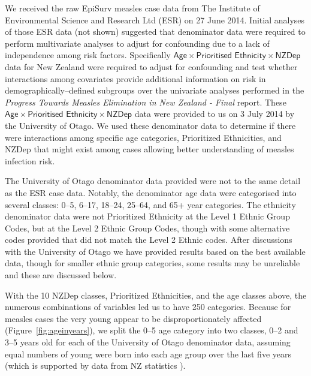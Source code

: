 \documentclass{article}
\begin{document}
\begin{itemize}
We received the raw EpiSurv measles case data from The Institute of Environmental Science and Research Ltd (ESR) on 27 June 2014. Initial analyses of those ESR data (not shown) suggested that denominator data were required to perform multivariate analyses to adjust for confounding due to a lack of independence among risk factors. Specifically $\textsf{Age} \times \textsf{Prioritised Ethnicity} \times \textsf{NZDep}$ data for New Zealand were required to adjust for confounding and test whether interactions among covariates provide additional information on risk in demographically--defined subgroups over the univariate analyses performed in the \emph{Progress Towards Measles Elimination in New Zealand - Final} report. These $\textsf{Age} \times \textsf{Prioritised Ethnicity} \times \textsf{NZDep}$ data were provided to us on 3 July 2014 by the University of Otago. We used these denominator data to determine if there were interactions among specific age categories, Prioritized Ethnicities, and NZDep that might exist among cases allowing better understanding of measles infection risk.

The University of Otago denominator data provided were not to the same detail as the ESR case data. Notably, the denominator age data were categorised into several classes: 0--5, 6--17, 18--24, 25--64, and 65+ year categories. The ethnicity denominator data were not Prioritized Ethnicity at the Level 1 Ethnic Group Codes, but at the Level 2 Ethnic Group Codes, though with some alternative codes provided that did not match the Level 2 Ethnic codes. After discussions with the University of Otago we have provided results based on the best available data, though for smaller ethnic group categories, some results may be unreliable and these are discussed below.

With the 10 NZDep classes, Prioritized Ethnicities, and the age classes above, the numerous combinations of variables led us to have 250 categories. Because for measles cases the very young appear to be disproportionately affected (Figure~\ref{fig:ageinyears}), we split the 0--5 age category into two classes, 0--2 and 3--5 years old for each of the University of Otago denominator data, assuming equal numbers of young were born into each age group over the last five years (which is supported by data from NZ statistics \citep{stats14}).



\end{itemize}
\end{document}
